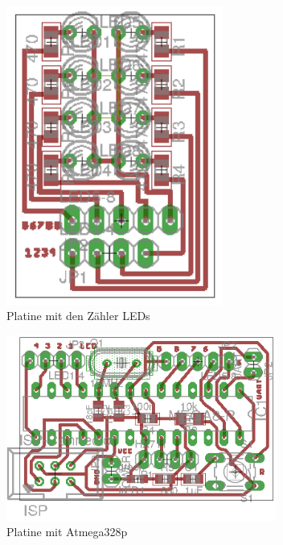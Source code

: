 \documentclass[12pt,journal]{IEEEtran}
\begin{document}
\begin{figure}[htbp]
  \centering
    \includegraphics[width=2.8in]{images/LED_Platine.png}
    \caption{Platine mit den Zähler LEDs}
  \label{fig_LED_Platine}
\end{figure}

\begin{figure}[htbp]
  \centering
    \includegraphics[width=3.5in]{images/atmega328p_platine.png}
    \caption{Platine mit Atmega328p}
  \label{fig_atmega328p_platine}
\end{figure}




\pagebreak
\end{document}
